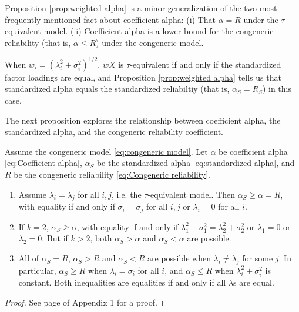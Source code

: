 \documentclass[twoside]{article}
\renewcommand{\sqrt}[1]{{(#1)^{1/2}}}
\begin{document}

Proposition \ref{prop:weighted alpha} is a minor generalization of the two most frequently mentioned fact about coefficient alpha: (i) That $\alpha =  R$ under the $\tau$-equivalent model. (ii) Coefficient alpha is a lower bound for the congeneric reliability (that is, $\alpha \leq  R$) under the congeneric model.
 
When $w_{i}=\sqrt{\lambda_{i}^{2}+\sigma_{i}^{2}}$, $wX$ is $\tau$-equivalent if and only if the standardized factor loadings are equal, and Proposition \ref{prop:weighted alpha} tells us that standardized alpha equals the standardized reliabiltiy (that is, $\alpha_S =  R_S$) in this case. 

The next proposition explores the relationship between coefficient alpha, the standardized alpha, and the congeneric reliability coefficient.

\begin{prop}
\label{prop:Reliabilities.}Assume the congeneric model \eqref{eq:congeneric model}. Let $\alpha$ be coefficient alpha \eqref{eq:Coefficient alpha}, $\alpha_S$ be the standardized alpha \eqref{eq:standardized alpha}, and  $ R$ be the congeneric reliability \eqref{eq:Congeneric reliability}. 
\begin{enumerate}[label=(\roman*)]
\item Assume $\lambda_{i}=\lambda_{j}$ for all $i,j$, i.e. the $\tau$-equivalent model. Then $\alpha_S \geq \alpha =  R$, with equality if and only if $\sigma_{i}=\sigma_{j}$ for all $i,j$ or $\lambda_i = 0$ for all $i$.
\item If $k=2$, $\alpha_S\geq\alpha$, with equality if and only if $\lambda_{1}^{2}+\sigma_{1}^{2}=\lambda_{2}^{2}+\sigma_{2}^{2}$ or $\lambda_1 = 0$ or $\lambda_2 = 0$. But if $k>2$, both $\alpha_S>\alpha$
and $\alpha_S<\alpha$ are possible.
\item All of $\alpha_S= R$, $\alpha_S> R$ and $\alpha_S< R$
are possible when $\lambda_{i}\neq\lambda_{j}$ for some $j$. In particular, $\alpha_S \geq  R$ when $\lambda_i = \sigma_i$ for all $i$, and $\alpha_S \leq  R$ when $\lambda_i^2 + \sigma_i^2$ is constant. Both inequalities are equalities if and only if all $\lambda$s are equal.
\end{enumerate}
\end{prop}
\begin{proof}
See page \pageref{proof:Reliabilities.} of Appendix 1 for a proof.
\end{proof}
\end{document}
